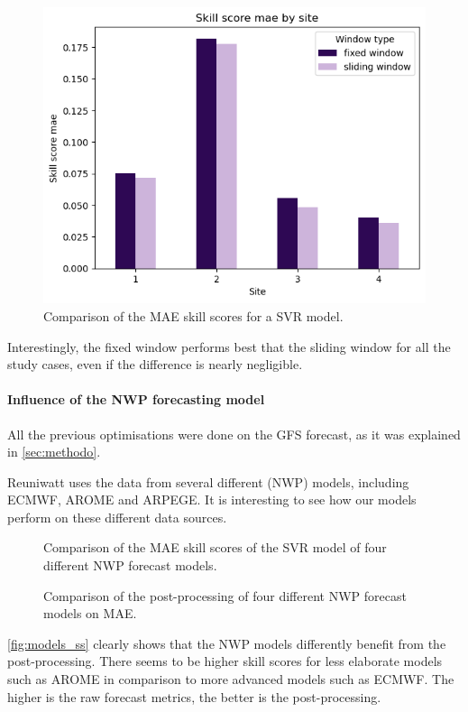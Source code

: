\begin{figure}[htb!]
    \centering
    \includegraphics[width=0.72\columnwidth]{figures/first_study/comp_window_mae_svr.png}
\caption{Comparison of the MAE skill scores for a SVR model.}
\end{figure}

Interestingly, the fixed window performs best that the sliding window for all the study cases, even if the difference is nearly negligible.

\paragraph{Influence of the NWP forecasting model}
\indent

All the previous optimisations were done on the GFS forecast, as it was explained in \autoref{sec:methodo}.

Reuniwatt uses the data from several different (NWP) models, including ECMWF, AROME and ARPEGE.
It is interesting to see how our models perform on these different data sources.
\begin{figure}[htb!]
    \centering
    
    \caption{Comparison of the MAE skill scores of the SVR model of four different NWP forecast models.}
    \label{fig:models_ss}   
\end{figure}
\newpage
\begin{figure}[htb!]
    \centering
    
\caption{Comparison of the post-processing of four different NWP forecast models on MAE.}
\label{fig:models_plot}
\end{figure}

\autoref{fig:models_ss} clearly shows that the NWP models differently benefit from the post-processing.
There seems to be higher skill scores for less elaborate models such as AROME in comparison to more advanced models such as ECMWF. The higher is the raw forecast metrics, the better is the post-processing.

